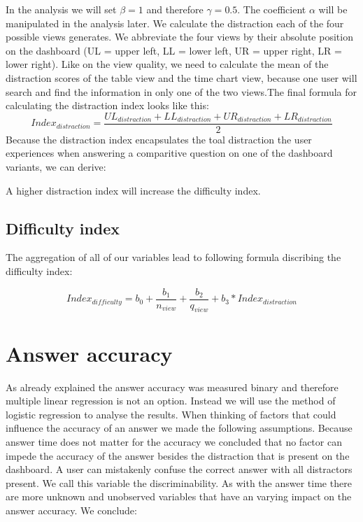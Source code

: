 In the analysis we will set $\beta = 1$ and therefore $\gamma = 0.5$. The coefficient $\alpha$ will be manipulated in the analysis later. 
We calculate the distraction each of the four possible views generates. We abbreviate the four views by their absolute position on the dashboard
(UL = upper left, LL = lower left, UR = upper right, LR = lower right). Like on the view quality, we need to calculate the mean of the distraction scores
of the table view and the time chart view, because one user will search and find the information in only one of the two views.The final formula for
calculating the distraction index looks like this:
\begin{equation} \label{distractionIndexEquation}
    Index_{distraction} = \frac{UL_{distraction} + LL_{distraction} + UR_{distraction} + LR_{distraction}}{2}
\end{equation} 
Because the distraction index encapsulates the toal distraction the user experiences when answering a comparitive question on one of the dashboard variants,
we can derive:
\begin{statements}[resume]
    \item A higher distraction index will increase the difficulty index.
\end{statements}

\subsection{Difficulty index}

The aggregation of all of our variables lead to following formula discribing the difficulty index:

\begin{equation} \label{difficultyIndexEquation}
    Index_{difficulty} = b_0 + \frac{b_1}{n_{view}} + \frac{b_2}{q_{view}} + b_3 * Index_{distraction}
\end{equation}


\section{Answer accuracy}
As already explained the answer accuracy was measured binary and therefore multiple linear regression is not an option. Instead we will use the
method of logistic regression to analyse the results. When thinking of factors that could influence the accuracy of an answer we made the
following assumptions. Because answer time does not matter for the accuracy we concluded that no factor can impede the accuracy of the answer besides the
distraction that is present on the dashboard. A user can mistakenly confuse the correct answer with all distractors present. We call this variable the
discriminability. As with the answer time there are more unknown and unobserved variables that have an varying impact on the answer accuracy.
We conclude:

